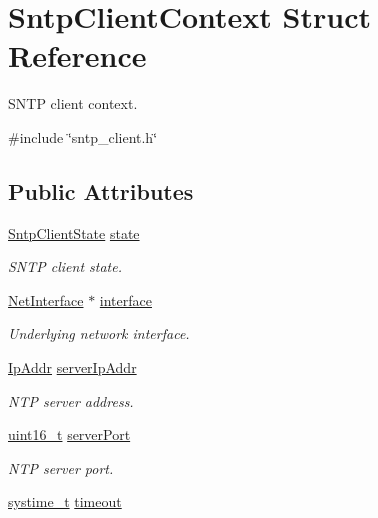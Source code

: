 \hypertarget{structSntpClientContext}{}\section{Sntp\+Client\+Context Struct Reference}
\label{structSntpClientContext}


S\+N\+TP client context.  




{\ttfamily \#include \char`\"{}sntp\+\_\+client.\+h\char`\"{}}

\subsection*{Public Attributes}
\begin{DoxyCompactItemize}
\item 
\hyperlink{sntp__client_8h_aeca73741bdca77b9eb50411f0c77136d}{Sntp\+Client\+State} \hyperlink{structSntpClientContext_af141be1c1ac01635b9788482dc791184}{state}
\begin{DoxyCompactList}\small\item\em S\+N\+TP client state. \end{DoxyCompactList}\item 
\hyperlink{net_8h_a2234db8911a1148c9159979d8f5e0d6b}{Net\+Interface} $\ast$ \hyperlink{structSntpClientContext_a201932df4f0b97e8b837d05658fb1a48}{interface}
\begin{DoxyCompactList}\small\item\em Underlying network interface. \end{DoxyCompactList}\item 
\hyperlink{structIpAddr}{Ip\+Addr} \hyperlink{structSntpClientContext_a28000ab694ab2426a9cba5958e77cd2e}{server\+Ip\+Addr}
\begin{DoxyCompactList}\small\item\em N\+TP server address. \end{DoxyCompactList}\item 
\hyperlink{stdint_8h_a273cf69d639a59973b6019625df33e30}{uint16\+\_\+t} \hyperlink{structSntpClientContext_aea4ed19ae27784311580a393fe350705}{server\+Port}
\begin{DoxyCompactList}\small\item\em N\+TP server port. \end{DoxyCompactList}\item 
\hyperlink{compiler__port_8h_ae3e32a98d431a02106616da3071832dd}{systime\+\_\+t} \hyperlink{structSntpClientContext_aeaec29fda82d9d620c9078d06a4d7b17}{timeout}

\end{DoxyCompactItemize}
